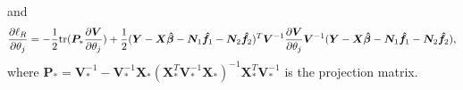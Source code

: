 \documentclass[review]{elsarticle}
\begin{document}
and 
\begin{equation} \label{score_theta}
{\partial \ell_R  \over \partial \theta_j}
=
- {1 \over 2}
{\rm tr} (\boldsymbol P_* {\partial \boldsymbol V \over \partial \theta_j})
+ {1 \over 2} 
(\boldsymbol Y - \boldsymbol X \boldsymbol {\hat\beta} - \boldsymbol N_1 \boldsymbol {\hat f}_1
 - \boldsymbol N_2 \boldsymbol {\hat f}_2)^T
\boldsymbol V^{-1}  
 {\partial \boldsymbol V \over \partial \theta_j}
 \boldsymbol V^{-1}  
(\boldsymbol Y - \boldsymbol X \boldsymbol {\hat\beta} - \boldsymbol N_1 \boldsymbol {\hat f}_1
 - \boldsymbol N_2 \boldsymbol {\hat f}_2),
\end{equation}
where 
$\boldsymbol P_* =  \boldsymbol V^{-1}_*
-\boldsymbol V^{-1}_*\boldsymbol X_*
(\boldsymbol X_*^T \boldsymbol V_*^{-1} \boldsymbol X_*)^{-1} 
\boldsymbol X_*^T \boldsymbol V^{-1}_*$ is the projection matrix. 
\end{document}
